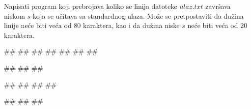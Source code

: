 \begin{Exercise}[label=p3_04] 
 Napisati program koji prebrojava koliko se linija datoteke $ulaz.txt$ završava niskom $s$ koja se učitava sa standardnog ulaza. Može se pretpostaviti da dužina linije neće biti veća od $80$ karaktera, kao i da dužina niske $s$ neće biti veća od $20$ karaktera.\\
\begin{miditest}
\begin{upotreba}{1}
##
##
##
##
##
##
##

#\naslovInt#
##
##
\end{upotreba}
\end{miditest}
\begin{miditest}
\begin{upotreba}{2}
##
##
##
##

#\naslovInt#
##
##
\end{upotreba}
\end{miditest}
\end{Exercise}
\begin{Answer}[ref=p3_04]
\end{Answer}


